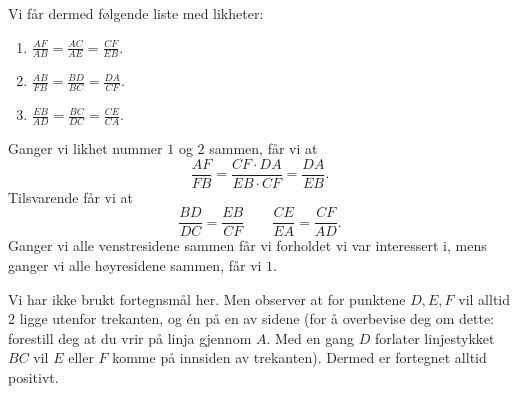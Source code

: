 \documentclass[11pt, norsk]{article}
\begin{document}
\begin{losn}
Vi får dermed følgende liste med likheter:
\begin{enumerate}
\item $\frac{AF}{AB}=\frac{AC}{AE}=\frac{CF}{EB}$.
\item $\frac{AB}{FB}=\frac{BD}{BC}=\frac{DA}{CF}$.
\item $\frac{EB}{AD}=\frac{BC}{DC}=\frac{CE}{CA}$.
\end{enumerate}
Ganger vi likhet nummer $1$ og $2$ sammen, får vi at
$$
\frac{AF}{FB} = \frac{CF \cdot DA}{EB \cdot CF} = \frac{DA}{EB}.
$$
Tilsvarende får vi at
$$
\frac{BD}{DC} = \frac{EB}{CF}  \qquad \frac{CE}{EA}=\frac{CF}{AD}.
$$
Ganger vi alle venstresidene sammen får vi forholdet vi var interessert i, mens ganger vi alle høyresidene sammen, får vi $1$. 

Vi har ikke brukt fortegnsmål her. Men observer at for punktene $D,E,F$ vil alltid $2$ ligge utenfor trekanten, og én på en av sidene (for å overbevise deg om dette: forestill deg at du vrir på linja gjennom $A$. Med en gang $D$ forlater linjestykket $BC$ vil $E$ eller $F$ komme på innsiden av trekanten). Dermed er fortegnet alltid positivt.


\end{losn}
\end{document}
